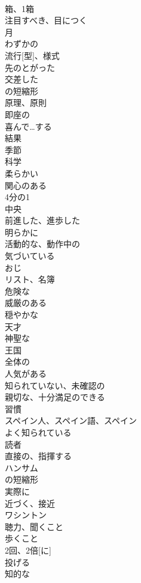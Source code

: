 \documentclass[8pt]{extreport}
\begin{document}
\begin{CJK}{UTF8}{min}
\\	箱、1箱
\\	注目すべき、目につく
\\	月
\\	わずかの
\\	流行[型]、様式
\\	先のとがった
\\	交差した
\\	の短縮形
\\	原理、原則
\\	即座の
\\	喜んで…する
\\	結果
\\	季節
\\	科学
\\	柔らかい
\\	関心のある
\\	4分の1
\\	中央
\\	前進した、進歩した
\\	明らかに
\\	活動的な、動作中の
\\	気づいている
\\	おじ
\\	リスト、名簿
\\	危険な
\\	威厳のある
\\	穏やかな
\\	天才
\\	神聖な
\\	王国
\\	全体の
\\	人気がある
\\	知られていない、未確認の
\\	親切な、十分満足のできる
\\	習慣
\\	スペイン人、スペイン語、スペイン
\\	よく知られている
\\	読者
\\	直接の、指揮する
\\	ハンサム
\\	の短縮形
\\	実際に
\\	近づく、接近
\\	ワシントン
\\	聴力、聞くこと
\\	歩くこと
\\	2回、2倍[に]
\\	投げる
\\	知的な

\end{CJK}
\end{document}
